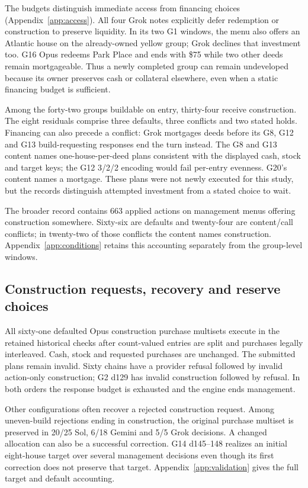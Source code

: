 The budgets distinguish immediate access from financing choices (Appendix~\ref{app:access}). All four Grok notes explicitly defer redemption or construction to preserve liquidity. In its two G1 windows, the menu also offers an Atlantic house on the already-owned yellow group; Grok declines that investment too. G16 Opus redeems Park Place and ends with \$75 while two other deeds remain mortgageable. Thus a newly completed group can remain undeveloped because its owner preserves cash or collateral elsewhere, even when a static financing budget is sufficient.

Among the forty-two groups buildable on entry, thirty-four receive construction. The eight residuals comprise three defaults, three conflicts and two stated holds. Financing can also precede a conflict: Grok mortgages deeds before its G8, G12 and G13 build-requesting responses end the turn instead. The G8 and G13 content names one-house-per-deed plans consistent with the displayed cash, stock and target keys; the G12 3/2/2 encoding would fail per-entry evenness. G20's content names a mortgage. These plans were not newly executed for this study, but the records distinguish attempted investment from a stated choice to wait.

The broader record contains 663 applied \End{} actions on management menus offering construction somewhere. Sixty-six are defaults and twenty-four are content/call conflicts; in twenty-two of those conflicts the content names construction. Appendix~\ref{app:conditions} retains this accounting separately from the group-level windows.

\subsection{Construction requests, recovery and reserve choices}

All sixty-one defaulted Opus construction purchase multisets execute in the retained historical checks after count-valued entries are split and purchases legally interleaved. Cash, stock and requested purchases are unchanged. The submitted plans remain invalid. Sixty chains have a provider refusal followed by invalid action-only construction; G2 d129 has invalid construction followed by refusal. In both orders the response budget is exhausted and the engine ends management.

Other configurations often recover a rejected construction request. Among uneven-build rejections ending in construction, the original purchase multiset is preserved in 20/25 Sol, 6/18 Gemini and 5/5 Grok decisions. A changed allocation can also be a successful correction. G14 d145--148 realizes an initial eight-house target over several management decisions even though its first correction does not preserve that target. Appendix~\ref{app:validation} gives the full target and default accounting.

